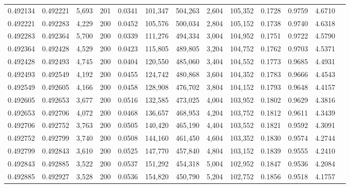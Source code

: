 \begin{tabular}{rrrrrrrrrrrrr}
0.492134 & 0.492221 &  5,693 & 201 &                                     0.0341 & 101,347 & 504,263 &   2,604 & 105,352 & 0.1728 & 0.9759 & 4.6710 \\
0.492221 & 0.492283 &  4,229 & 200 &                                     0.0452 & 105,576 & 500,034 &   2,804 & 105,152 & 0.1738 & 0.9740 & 4.6318 \\
0.492283 & 0.492364 &  5,700 & 200 &                                     0.0339 & 111,276 & 494,334 &   3,004 & 104,952 & 0.1751 & 0.9722 & 4.5790 \\
0.492364 & 0.492428 &  4,529 & 200 &                                     0.0423 & 115,805 & 489,805 &   3,204 & 104,752 & 0.1762 & 0.9703 & 4.5371 \\
0.492428 & 0.492493 &  4,745 & 200 &                                     0.0404 & 120,550 & 485,060 &   3,404 & 104,552 & 0.1773 & 0.9685 & 4.4931 \\
0.492493 & 0.492549 &  4,192 & 200 &                                     0.0455 & 124,742 & 480,868 &   3,604 & 104,352 & 0.1783 & 0.9666 & 4.4543 \\
0.492549 & 0.492605 &  4,166 & 200 &                                     0.0458 & 128,908 & 476,702 &   3,804 & 104,152 & 0.1793 & 0.9648 & 4.4157 \\
0.492605 & 0.492653 &  3,677 & 200 &                                     0.0516 & 132,585 & 473,025 &   4,004 & 103,952 & 0.1802 & 0.9629 & 4.3816 \\
0.492653 & 0.492706 &  4,072 & 200 &                                     0.0468 & 136,657 & 468,953 &   4,204 & 103,752 & 0.1812 & 0.9611 & 4.3439 \\
0.492706 & 0.492752 &  3,763 & 200 &                                     0.0505 & 140,420 & 465,190 &   4,404 & 103,552 & 0.1821 & 0.9592 & 4.3091 \\
0.492752 & 0.492799 &  3,740 & 200 &                                     0.0508 & 144,160 & 461,450 &   4,604 & 103,352 & 0.1830 & 0.9574 & 4.2744 \\
0.492799 & 0.492843 &  3,610 & 200 &                                     0.0525 & 147,770 & 457,840 &   4,804 & 103,152 & 0.1839 & 0.9555 & 4.2410 \\
0.492843 & 0.492885 &  3,522 & 200 &                                     0.0537 & 151,292 & 454,318 &   5,004 & 102,952 & 0.1847 & 0.9536 & 4.2084 \\
0.492885 & 0.492927 &  3,528 & 200 &                                     0.0536 & 154,820 & 450,790 &   5,204 & 102,752 & 0.1856 & 0.9518 & 4.1757 \\

\end{tabular}
